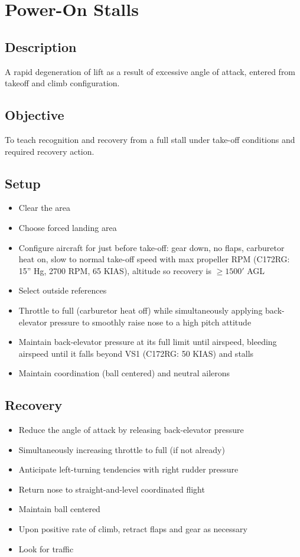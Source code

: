 \section{Power-On Stalls}

\subsection{Description}

A rapid degeneration of lift as a result of excessive angle of attack, entered
from takeoff and climb configuration.

\subsection{Objective}

To teach recognition and recovery from a full stall under take-off conditions
and required recovery action.

\subsection{Setup}

\begin{itemize}
  \item Clear the area
  \item Choose forced landing area
  \item Configure aircraft for just before take-off: gear down, no flaps,
    carburetor heat on, slow to normal take-off speed with max propeller RPM
    (C172RG: 15'' Hg, 2700 RPM, 65 KIAS), altitude so recovery is $\geq 1500'$
    AGL
  \item Select outside references
  \item Throttle to full (carburetor heat off) while simultaneously applying
    back-elevator pressure to smoothly raise nose to a high pitch attitude
  \item Maintain back-elevator pressure at its full limit until airspeed,
    bleeding airspeed until it falls beyond VS1 (C172RG: 50 KIAS) and stalls
  \item Maintain coordination (ball centered) and neutral ailerons
\end{itemize}

\subsection{Recovery}

\begin{itemize}
  \item Reduce the angle of attack by releasing back-elevator pressure
  \item Simultaneously increasing throttle to full (if not already)
  \item Anticipate left-turning tendencies with right rudder pressure
  \item Return nose to straight-and-level coordinated flight 
  \item Maintain ball centered
  \item Upon positive rate of climb, retract flaps and gear as necessary 
  \item Look for traffic
\end{itemize}

